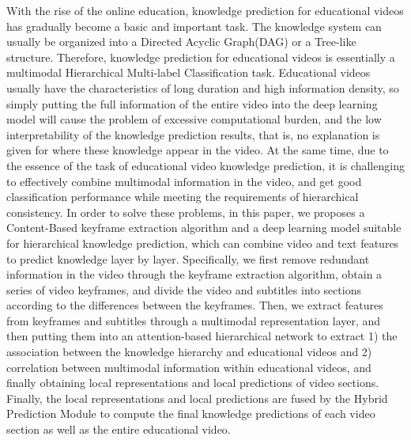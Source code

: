 \begin{abstract*}
    With the rise of the online education, knowledge prediction for educational videos has gradually become a basic and important task.
    The knowledge system can usually be organized into a Directed Acyclic Graph(DAG) or a Tree-like structure.
    Therefore, knowledge prediction for educational videos is essentially a multimodal Hierarchical Multi-label Classification task.
    Educational videos usually have the characteristics of long duration and high information density,
    so simply putting the full information of the entire video into the deep learning model will cause the problem of excessive computational burden,
    and the low interpretability of the knowledge prediction results,
    that is, no explanation is given for where these knowledge appear in the video.
    At the same time, due to the essence of the task of educational video knowledge prediction,
    it is challenging to effectively combine multimodal information in the video, and get good classification performance while meeting the requirements of hierarchical consistency.
    In order to solve these problems, in this paper, we proposes a Content-Based keyframe extraction algorithm and a deep learning model suitable for hierarchical knowledge prediction,
    which can combine video and text features to predict knowledge layer by layer.
    Specifically, we first remove redundant information in the video through the keyframe extraction algorithm,
    obtain a series of video keyframes, and divide the video and subtitles into sections according to the differences between the keyframes.
    Then, we extract features from keyframes and subtitles through a multimodal representation layer, and then putting them into an attention-based hierarchical network to extract
    1) the association between the knowledge hierarchy and educational videos and
    2) correlation between multimodal information within educational videos,
    and finally obtaining local representations and local predictions of video sections.
    Finally, the local representations and local predictions are fused by the Hybrid Prediction Module to compute the final knowledge predictions of each video section as well as the entire educational video.
\end{abstract*}
